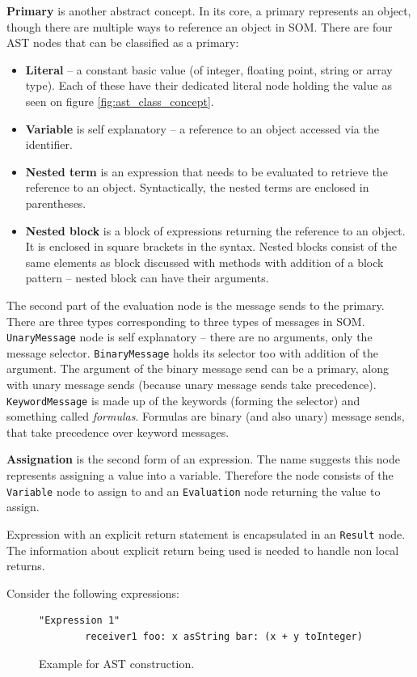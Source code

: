\documentclass[thesis=M,english]{FITthesis}[2019/12/23]
\begin{document}
\textbf{Primary} is another abstract concept. In its core, a primary represents an object, though there are multiple ways to reference an object in SOM.
There are four AST nodes that can be classified as a primary:
\begin{itemize}
	\item \textbf{Literal} -- a constant basic value (of integer, floating point, string or array type). Each of these have their dedicated literal node
		holding the value as seen on figure \ref{fig:ast_class_concept}.
	\item \textbf{Variable} is self explanatory -- a reference to an object accessed via the identifier.
	\item \textbf{Nested term} is an expression that needs to be evaluated to retrieve the reference to an object. Syntactically, the nested terms
		are enclosed in parentheses.
	\item \textbf{Nested block} is a block of expressions returning the reference to an object. It is enclosed in square brackets in the syntax.
		Nested blocks consist of the same elements as block discussed with methods with addition of a block pattern -- nested block can have their arguments.
\end{itemize}

The second part of the evaluation node is the message sends to the primary. There are three types corresponding to three types of messages in SOM.
\texttt{UnaryMessage} node is self explanatory -- there are no arguments, only the message selector. \texttt{BinaryMessage} holds its selector too
with addition of the argument. The argument of the binary message send can be a primary, along with unary message sends (because unary message sends take
precedence). \texttt{KeywordMessage} is made up of the keywords (forming the selector) and something called \textit{formulas}. Formulas are binary (and also unary) message
sends, that take precedence over keyword messages.

\textbf{Assignation} is the second form of an expression. The name suggests this node represents assigning a value into a variable. Therefore the node consists
of the \texttt{Variable} node to assign to and an \texttt{Evaluation} node returning the value to assign.

Expression with an explicit return statement is encapsulated in an \texttt{Result} node. The information about explicit return being used is needed
to handle non local returns.

Consider the following expressions:
\begin{figure}[h!]
	\centering
	\begin{lstlisting}[language=Smalltalk]
		"Expression 1"
		receiver1 foo: x asString bar: (x + y toInteger) 
	\end{lstlisting}
	\caption{Example for AST construction.}
	\label{fig:ast_constr_ex}
\end{figure}
\end{document}
